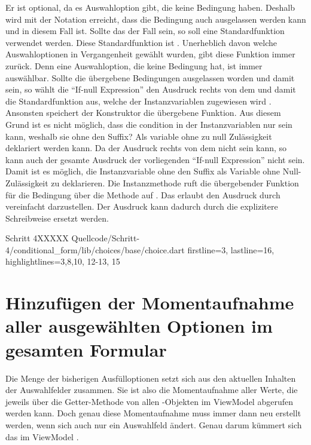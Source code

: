 Er ist optional,  da es Auswahloption gibt, die keine Bedingung haben. 
Deshalb wird mit der Notation  erreicht,
dass die Bedingung auch ausgelassen werden kann und in diesem Fall  ist.
Sollte das der Fall sein,
so soll eine Standardfunktion verwendet werden.
Diese Standardfunktion ist  .
Unerheblich davon welche Auswahloptionen in Vergangenheit gewählt wurden,
gibt diese Funktion immer  zurück.
Denn eine Auswahloption,
die keine Bedingung hat,
ist immer auswählbar. 
Sollte die übergebene Bedingungen ausgelassen worden und damit  sein,
so wählt die \enquote{If-null Expression} den Ausdruck rechts von dem  und damit die Standardfunktion  aus,
welche der Instanzvariablen  zugewiesen wird .
Ansonsten speichert der Konstruktor die übergebene Funktion. 
Aus diesem Grund ist es nicht möglich,
dass die condition in der Instanzvariablen nur sein kann,
weshalb sie ohne den Suffix? Als variable ohne zu null Zulässigkeit deklariert werden kann. 
Da der Ausdruck rechts von dem  nicht  sein kann,
so kann auch der gesamte Ausdruck der vorliegenden \enquote{If-null Expression} nicht  sein.
Damit ist es möglich,
die Instanzvariable  ohne den Suffix  als Variable ohne Null-Zulässigkeit zu deklarieren. 
Die Instanzmethode  ruft die übergebender Funktion für die Bedingung über die Methode  auf .
Das erlaubt den Ausdruck  durch vereinfacht darzustellen. 
Der Ausdruck  kann dadurch durch die explizitere Schreibweise  ersetzt werden. 

\begin{alexlisting}{Schritt 4}{XXXXX}
  {Quellcode/Schritt-4/conditional_form/lib/choices/base/choice.dart}
  {firstline=3, lastline=16, highlightlines={3,8,10, 12-13, 15 }}
  \label{lst:Schritt4Choice}
\end{alexlisting}

\section{Hinzufügen der Momentaufnahme aller ausgewählten Optionen im gesamten Formular}

Die Menge der bisherigen Ausfülloptionen setzt sich aus den aktuellen Inhalten der Auswahlfelder zusammen.
Sie ist also die Momentaufnahme aller Werte,
die jeweils über die Getter-Methode  von allen -Objekten im ViewModel abgerufen werden kann.
Doch genau diese Momentaufnahme muss immer dann neu erstellt werden,
wenn sich auch nur ein Auswahlfeld ändert.
Genau darum kümmert sich das   im ViewModel \Lst{\ref{lst:Schritt4priorChoices}}.

